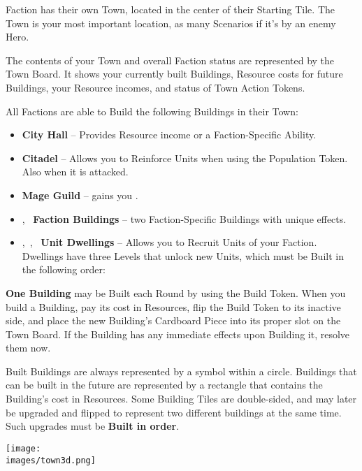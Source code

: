 
\begin{multicols}{2}

 Faction has their own Town, located in the center of their Starting Tile.
The Town is your most important location, as many Scenarios  if it's  by an enemy Hero.\par
The contents of your Town and overall Faction status are represented by the Town Board.
It shows your currently built Buildings, Resource costs for future Buildings, your Resource incomes, and status of Town Action Tokens.\par
All Factions are able to Build the following Buildings in their Town:
\begin{itemize}
  \item {} \textbf{City Hall} -- Provides Resource income or a Faction-Specific Ability.
  \item {} \textbf{Citadel} -- Allows you to Reinforce Units when using the Population Token.
        Also  when it is attacked.
  \item {} \textbf{Mage Guild} -- gains you .
  \item {},~ \textbf{Faction Buildings} -- two Faction-Specific Buildings with unique effects.
  \columnbreak
  \item {},~,~ \textbf{Unit Dwellings} -- Allows you to Recruit Units of your Faction.
        Dwellings have three Levels that unlock new Units, which must be Built in the following order:   
\end{itemize}
\textbf{One Building} may be Built each Round by using the Build Token.
When you build a Building, pay its cost in Resources, flip the Build Token to its inactive side, and place the new Building’s Cardboard Piece into its proper slot on the Town Board.
If the Building has any immediate effects upon Building it, resolve them now.\par
Built Buildings are always represented by a symbol within a circle.
Buildings that can be built in the future are represented by a rectangle that contains the Building's cost in Resources.
Some Building Tiles are double-sided, and may later be upgraded and flipped to represent two different buildings at the same time. Such upgrades must be \textbf{Built in order}.\par

\end{multicols}

\vfill
\begin{center}
  \texttt{[image: \\images/town3d.png]}
\end{center}
\vfill
